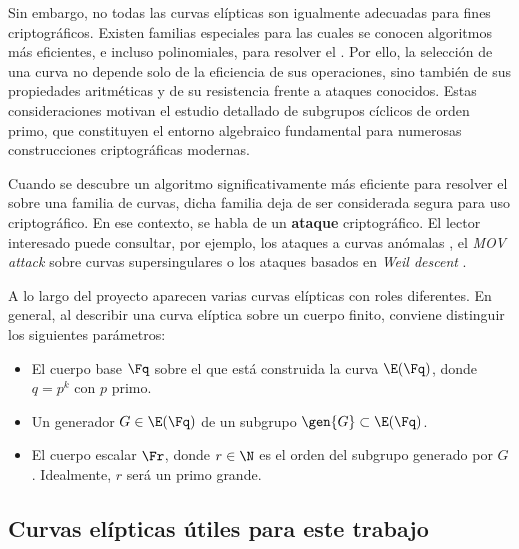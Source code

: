 Sin embargo, no todas las curvas elípticas son igualmente adecuadas para fines criptográficos. Existen familias especiales para las cuales se conocen algoritmos más eficientes, e incluso polinomiales, para resolver el \ECDLP. Por ello, la selección de una curva no depende solo de la eficiencia de sus operaciones, sino también de sus propiedades aritméticas y de su resistencia frente a ataques conocidos. Estas consideraciones motivan el estudio detallado de subgrupos cíclicos de orden primo, que constituyen el entorno algebraico fundamental para numerosas construcciones criptográficas modernas.

Cuando se descubre un algoritmo significativamente más eficiente para resolver el \ECDLP sobre una familia de curvas, dicha familia deja de ser considerada segura para uso criptográfico. En ese contexto, se habla de un \textbf{ataque} criptográfico. El lector interesado puede consultar, por ejemplo, los ataques a curvas anómalas \cite{Smart1999}, el \textit{MOV attack} sobre curvas supersingulares \cite{Menezes1993} o los ataques basados en \textit{Weil descent} \cite{Hess2005}.

A lo largo del proyecto aparecen varias curvas elípticas con roles diferentes. En general, al describir una curva elíptica sobre un cuerpo finito, conviene distinguir los siguientes parámetros:
\begin{itemize}
	\item El cuerpo base $\Fq$ sobre el que está construida la curva $\E(\Fq)$, donde $q = p^k$ con $p$ primo.
	\item Un generador $G \in \E(\Fq)$ de un subgrupo $\gen{G} \subset \E(\Fq)$.
	\item El cuerpo escalar $\Fr$, donde $r \in \N$ es el orden del subgrupo generado por $G$. Idealmente, $r$ será un primo grande.
\end{itemize}

\subsection{Curvas elípticas útiles para este trabajo}

